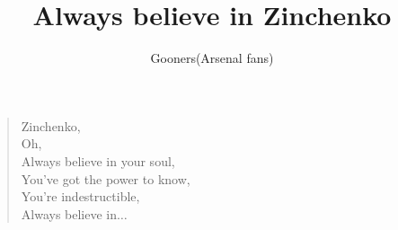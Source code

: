 \documentclass[a4paper,12pt]{article}
\title{Always believe in Zinchenko}
\author{Gooners(Arsenal fans)}
\date{}
\begin{document}
	
	\maketitle
	
	\begin{verse}
		
		Zinchenko, \\
		Oh, \\
		Always believe in your soul, \\
		You've got the power to know, \\
		You're indestructible, \\
		Always believe in$\ldots$
		
	\end{verse}
	
\end{document}
